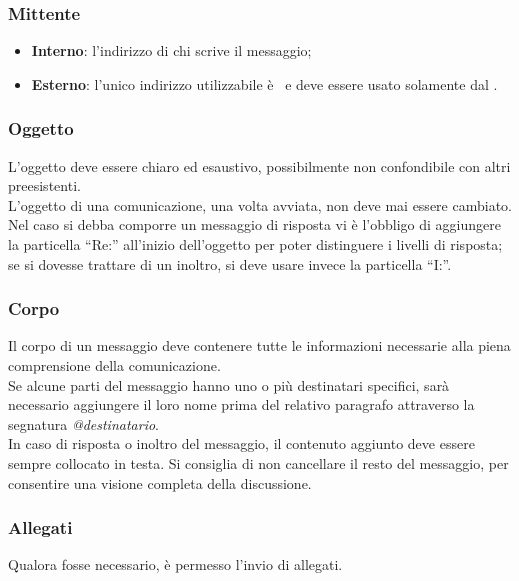 \documentclass[../NormeDiProgetto.tex]{subfiles}
\begin{document}
				\subsubsection{Mittente}
					\begin{itemize}
						\item \textbf{Interno}: l'indirizzo di chi scrive
						il messaggio;
						\item \textbf{Esterno}: l'unico indirizzo utilizzabile è
						\mailkaleidoscode\ e deve essere usato solamente dal
						\responsabilediprogetto.
					\end{itemize}
				\subsubsection{Oggetto}
					L'oggetto deve essere chiaro ed esaustivo, possibilmente non
					confondibile con altri preesistenti.\\
					L'oggetto di una comunicazione, una volta avviata, non deve mai essere cambiato.\\
					Nel caso si debba comporre un messaggio di risposta vi è l'obbligo di aggiungere la
					particella ``Re:'' all'inizio dell'oggetto per poter distinguere i
					livelli di risposta; se si dovesse trattare di un inoltro, si deve
					usare invece la particella ``I:''.
				\subsubsection{Corpo}
					Il corpo di un messaggio deve contenere tutte le informazioni
					necessarie alla piena comprensione della comunicazione.\\
					Se alcune parti del messaggio hanno uno o più destinatari specifici,
					sarà necessario aggiungere il loro nome	prima del relativo paragrafo
					attraverso la segnatura	\textit{@destinatario}.\\
					In caso di risposta o inoltro del messaggio, il contenuto aggiunto deve
					essere sempre collocato in testa.
					Si consiglia di non cancellare il resto del messaggio,
					per consentire una visione completa della discussione.
				\subsubsection{Allegati}
					Qualora fosse necessario, è permesso l'invio di allegati.
\end{document}
